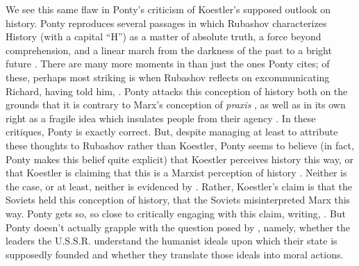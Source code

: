 We see this same flaw in Ponty's criticism of Koestler's supposed outlook on
history. Ponty reproduces several passages in which Rubashov characterizes History (with a
capital \enquote{H}) as a matter of absolute truth, a force beyond comprehension, and a
linear march from the darkness of the past to a bright future \parencite[19]{ponty}. There
are many more moments in \dark{} than just the ones Ponty cites; of these, perhaps most
striking is when Rubashov reflects on excommunicating Richard, having told him,
. Ponty attacks this conception of history both on the grounds
that it is contrary to Marx's conception of \textit{praxis} \parencite[18]{ponty}, as well
as in its own right as a fragile idea which insulates people from their agency
\parencite[19]{ponty}. In these critiques, Ponty is exactly correct. But, despite managing
at least to attribute these thoughts to Rubashov rather than Koestler, Ponty seems to
believe (in fact, Ponty makes this belief quite explicit) that Koestler perceives history
this way, or that Koestler is claiming that this is a Marxist perception of
history \parencite[20]{ponty}. Neither is the case, or at least, neither is evidenced by
\dark{}. Rather, Koestler's claim is that the Soviets held this conception of history,
that the Soviets misinterpreted Marx this way. Ponty gets so, so close to critically
engaging with this claim, writing, . But Ponty doesn't actually grapple with
the question posed by \dark{}, namely, whether the leaders the U.S.S.R. understand the
humanist ideals upon which their state is supposedly founded and whether they translate
those ideals into moral actions.

